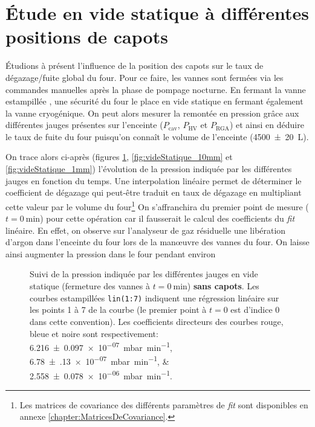 \section{Étude en vide statique à différentes positions de capots}
\label{section:videStatique}
Étudions à présent l'influence de la position des capots sur le taux de dégazage/fuite global du four. Pour ce faire, les vannes sont fermées via les commandes manuelles après la phase de pompage nocturne. En fermant la vanne estampillée , une sécurité du four le place en vide statique en fermant également la vanne cryogénique. On peut alors mesurer la remontée en pression grâce aux différentes jauges présentes sur l'enceinte ($P_\text{cav}$, $P_\text{HV}$ et $P_\text{RGA}$) et ainsi en déduire le taux de fuite du four puisqu'on connaît le volume de l'enceinte (\SI[separate-uncertainty = true, multi-part-units=single]{4500(20)}{\liter}).

On trace alors ci-après (figures \ref{fig:videStatique_sansCapots}, \ref{fig:videStatique_10mm} et \ref{fig:videStatique_1mm}) l'évolution de la pression indiquée par les différentes jauges en fonction du temps. Une interpolation linéaire permet de déterminer le coefficient de dégazage qui peut-être traduit en taux de dégazage en multipliant cette valeur par le volume du four\footnote{Les matrices de covariance des différents paramètres de \textit{fit} sont disponibles en annexe \ref{chapter:MatricesDeCovariance}.} On s'affranchira du premier point de mesure ($t=\SI{0}{\minute}$) pour cette opération car il fausserait le calcul des coefficients du \textit{fit} linéaire. En effet, on observe sur l'analyseur de gaz résiduelle une libération d'argon dans l'enceinte du four lors de la man\oe{}uvre des vannes du four. On laisse ainsi augmenter la pression dans le four pendant environ 

\begin{figure}
    \centering
    
    \caption{Suivi de la pression indiquée par les différentes jauges en vide statique (fermeture des vannes à $t=\SI{0}{\minute}$) \textbf{sans capots}. Les courbes estampillées \texttt{lin(1:7)} indiquent une régression linéaire sur les points 1 à 7 de la courbe (le premier point à $t=0$ est d'indice 0 dans cette convention). Les coefficients directeurs des courbes rouge, bleue et noire sont respectivement: \SIlist{6.216(97)e-07; 6.78(13)e-07; 2.558(78)e-06}{\milli\bar\per\minute}.}
    \label{fig:videStatique_sansCapots}
\end{figure}

